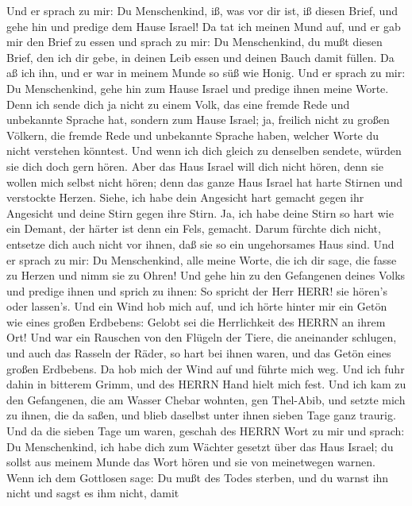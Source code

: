  Und er sprach zu mir: Du Menschenkind, iß, was vor dir ist,
iß diesen Brief, und gehe hin und predige dem Hause Israel! 
Da tat ich meinen Mund auf, und er gab mir den Brief zu essen
 und sprach zu mir: Du Menschenkind, du mußt diesen Brief,
den ich dir gebe, in deinen Leib essen und deinen Bauch damit füllen. Da
aß ich ihn, und er war in meinem Munde so süß wie Honig. 
Und er sprach zu mir: Du Menschenkind, gehe hin zum Hause Israel und
predige ihnen meine Worte.  Denn ich sende dich ja nicht zu
einem Volk, das eine fremde Rede und unbekannte Sprache hat, sondern zum
Hause Israel;  ja, freilich nicht zu großen Völkern, die
fremde Rede und unbekannte Sprache haben, welcher Worte du nicht
verstehen könntest. Und wenn ich dich gleich zu denselben sendete,
würden sie dich doch gern hören.  Aber das Haus Israel will
dich nicht hören, denn sie wollen mich selbst nicht hören; denn das
ganze Haus Israel hat harte Stirnen und verstockte Herzen. 
Siehe, ich habe dein Angesicht hart gemacht gegen ihr Angesicht und
deine Stirn gegen ihre Stirn.  Ja, ich habe deine Stirn so
hart wie ein Demant, der härter ist denn ein Fels, gemacht. Darum
fürchte dich nicht, entsetze dich auch nicht vor ihnen, daß sie so ein
ungehorsames Haus sind.  Und er sprach zu mir: Du
Menschenkind, alle meine Worte, die ich dir sage, die fasse zu Herzen
und nimm sie zu Ohren!  Und gehe hin zu den Gefangenen
deines Volks und predige ihnen und sprich zu ihnen: So spricht der Herr
HERR! sie hören's oder lassen's.  Und ein Wind hob mich
auf, und ich hörte hinter mir ein Getön wie eines großen Erdbebens:
Gelobt sei die Herrlichkeit des HERRN an ihrem Ort!  Und
war ein Rauschen von den Flügeln der Tiere, die aneinander schlugen, und
auch das Rasseln der Räder, so hart bei ihnen waren, und das Getön eines
großen Erdbebens.  Da hob mich der Wind auf und führte mich
weg. Und ich fuhr dahin in bitterem Grimm, und des HERRN Hand hielt mich
fest.  Und ich kam zu den Gefangenen, die am Wasser Chebar
wohnten, gen Thel-Abib, und setzte mich zu ihnen, die da saßen, und
blieb daselbst unter ihnen sieben Tage ganz traurig.  Und
da die sieben Tage um waren, geschah des HERRN Wort zu mir und sprach:
 Du Menschenkind, ich habe dich zum Wächter gesetzt über
das Haus Israel; du sollst aus meinem Munde das Wort hören und sie von
meinetwegen warnen.  Wenn ich dem Gottlosen sage: Du mußt
des Todes sterben, und du warnst ihn nicht und sagst es ihm nicht, damit
